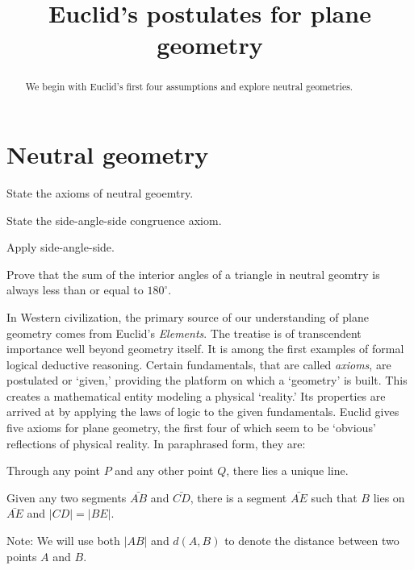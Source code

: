 \documentclass[instructornotes]{ximera}
\title{Euclid's postulates for plane geometry} %
\begin{document}
\begin{abstract}
We begin with Euclid's first four assumptions and explore neutral
geometries.
\end{abstract}
\maketitle



\section{Neutral geometry}


\begin{listOutcomes}
\item State the axioms of neutral geoemtry.
\item State the side-angle-side congruence axiom.
\item Apply side-angle-side.
\item Prove that the sum of the interior angles of a triangle in
  neutral geomtry is always less than or equal to $180^\circ$.
\end{listOutcomes}



In Western civilization, the primary source of our understanding of
plane geometry comes from Euclid's \textit{Elements}. The treatise is
of transcendent importance well beyond geometry itself. It is among
the first examples of formal logical deductive reasoning. Certain
fundamentals, that are called \textit{axioms}, are postulated or
`given,' providing the platform on which a `geometry' is built. This
creates a mathematical entity modeling a physical `reality.' Its
properties are arrived at by applying the laws of logic to the given
fundamentals. Euclid gives five axioms for plane geometry, the first
four of which seem to be `obvious' reflections of physical reality. In
paraphrased form, they are:

\begin{axiom}[E1]
Through any point $P$ and any other point $Q$, there lies a unique
line.
\end{axiom}

\begin{axiom}[E2] 
Given any two segments $\bar{AB}$ and $\bar{CD}$, there is a
segment $\bar{AE}$ such that $B$ lies on $\bar{AE}$ and
$\left\vert CD\right\vert =\left\vert BE\right\vert$.

Note: We will use both $\left\vert AB\right\vert$ and $d(A,B)$ to
denote the distance between two points $A$ and $B$.
\end{axiom}
\end{document}
